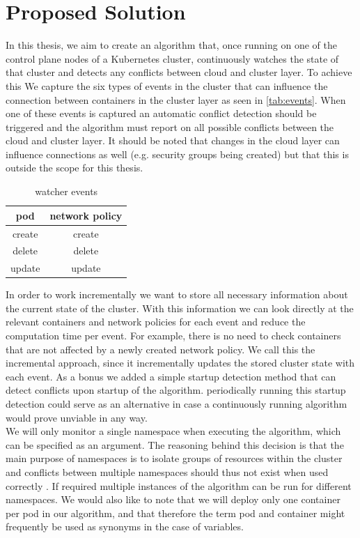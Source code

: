 \chapter{Proposed Solution}                                 \label{ch:solution}

In this thesis, we aim to create an algorithm that, once running on one of the control plane nodes of a Kubernetes cluster, continuously watches the state of that cluster and detects any conflicts between cloud and cluster layer. To achieve this We capture the six types of events in the cluster that can influence the connection between containers in the cluster layer as seen in \autoref{tab:events}. When one of these events is captured an automatic conflict detection should be triggered and the algorithm must report on all possible conflicts between the cloud and cluster layer. It should be noted that changes in the cloud layer can influence connections as well (e.g. security groups being created) but that this is outside the scope for this thesis.
\\[10pt]
\begin{table}[htbp]
  \centering
  \begin{tabular}{|c|c|}
    \hline
    pod & network policy \\
    \hline
    create & create \\
    delete & delete \\
    update & update \\
    \hline
  \end{tabular}
  \caption{watcher events}
  \label{tab:events}

\end{table}

In order to work incrementally we want to store all necessary information about the current state of the cluster. With this information we can look directly at the relevant containers and network policies for each event and reduce the computation time per event. For example, there is no need to check containers that are not affected by a newly created network policy. We call this the incremental approach, since it incrementally updates the stored cluster state with each event. As a bonus we added a simple startup detection method that can detect conflicts upon startup of the algorithm. periodically running this startup detection could serve as an alternative in case a continuously running algorithm would prove unviable in any way.  
\\[10pt]

We will only monitor a single namespace when executing the algorithm, which can be specified as an argument. The reasoning behind this decision is that the main purpose of namespaces is to isolate groups of resources within the cluster and conflicts between multiple namespaces should thus not exist when used correctly \cite{namespace}. If required multiple instances of the algorithm can be run for different namespaces. We would also like to note that we will deploy only one container per pod in our algorithm, and that therefore the term pod and container might frequently be used as synonyms in the case of variables.
\\[10pt]

